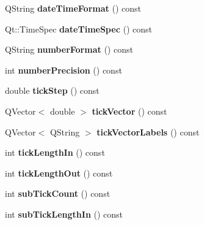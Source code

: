 \begin{DoxyCompactItemize}
\item 
\hypertarget{classQCPAxis_a132b54ae184a12ed24c9af24f53dc70b}{\-Q\-String {\bfseries date\-Time\-Format} () const }\label{classQCPAxis_a132b54ae184a12ed24c9af24f53dc70b}

\item 
\hypertarget{classQCPAxis_afdd04c56ed29a9d948f840fc76f0d383}{\-Qt\-::\-Time\-Spec {\bfseries date\-Time\-Spec} () const }\label{classQCPAxis_afdd04c56ed29a9d948f840fc76f0d383}

\item 
\hypertarget{classQCPAxis_ae6729b40845b29ffa5a440aa53cec215}{\-Q\-String {\bfseries number\-Format} () const }\label{classQCPAxis_ae6729b40845b29ffa5a440aa53cec215}

\item 
\hypertarget{classQCPAxis_a91cb2825060ac79a889296377fe0c7c1}{int {\bfseries number\-Precision} () const }\label{classQCPAxis_a91cb2825060ac79a889296377fe0c7c1}

\item 
\hypertarget{classQCPAxis_a0e6120d24266544441ab691f316a1b03}{double {\bfseries tick\-Step} () const }\label{classQCPAxis_a0e6120d24266544441ab691f316a1b03}

\item 
\hypertarget{classQCPAxis_a5b00b14f480f926df976cc6c52309e78}{\-Q\-Vector$<$ double $>$ {\bfseries tick\-Vector} () const }\label{classQCPAxis_a5b00b14f480f926df976cc6c52309e78}

\item 
\hypertarget{classQCPAxis_a64e6fa81f943ad33dcaf3fa606687b93}{\-Q\-Vector$<$ \-Q\-String $>$ {\bfseries tick\-Vector\-Labels} () const }\label{classQCPAxis_a64e6fa81f943ad33dcaf3fa606687b93}

\item 
\hypertarget{classQCPAxis_a59265d65c5034695ac2578bccbbb0f4a}{int {\bfseries tick\-Length\-In} () const }\label{classQCPAxis_a59265d65c5034695ac2578bccbbb0f4a}

\item 
\hypertarget{classQCPAxis_ae1b3d7473f50ba8544b2027c1cdc80f2}{int {\bfseries tick\-Length\-Out} () const }\label{classQCPAxis_ae1b3d7473f50ba8544b2027c1cdc80f2}

\item 
\hypertarget{classQCPAxis_a290b4c1375476826daa10e914cb71dab}{int {\bfseries sub\-Tick\-Count} () const }\label{classQCPAxis_a290b4c1375476826daa10e914cb71dab}

\item 
\hypertarget{classQCPAxis_a052e6ab2ada7e87fa5e5831dcbd4a517}{int {\bfseries sub\-Tick\-Length\-In} () const }\label{classQCPAxis_a052e6ab2ada7e87fa5e5831dcbd4a517}


\end{DoxyCompactItemize}
